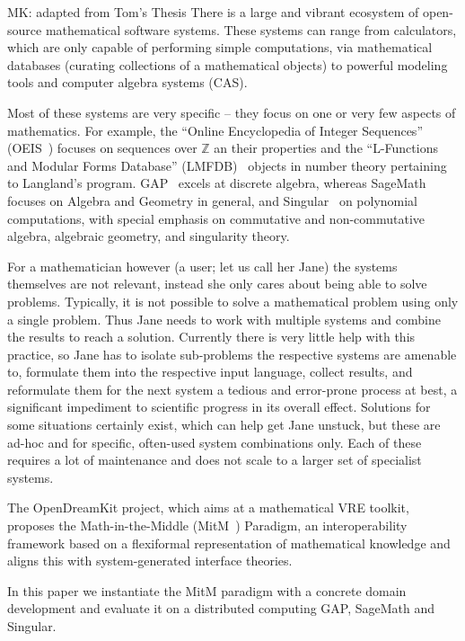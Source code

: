 \documentclass{llncs}
\begin{document}
\begin{newpart}{MK: adapted from Tom's Thesis}
There is a large and vibrant ecosystem of open-source mathematical software systems.
These systems can range from calculators, which are only capable of performing simple
computations, via mathematical databases (curating collections of a mathematical objects)
to powerful modeling tools and computer algebra systems (CAS). 

Most of these systems are very specific -- they focus on one or very few aspects of
mathematics.  For example, the ``Online Encyclopedia of Integer Sequences''
(OEIS~\cite{Sloane:oeis12,oeis}) focuses on sequences over $\mathbb{Z}$ an their
properties and the ``L-Functions and Modular Forms Database''
(LMFDB)~\cite{Cremona:LMFDB16,lmfdb:on} objects in number theory pertaining to Langland's
program.  GAP~\cite{GAP:on} excels at discrete algebra, whereas
SageMath~\cite{SageMath:on} focuses on Algebra and Geometry in general, and
Singular~\cite{singular:on} on polynomial computations, with special emphasis on
commutative and non-commutative algebra, algebraic geometry, and singularity theory.

For a mathematician however (a user; let us call her Jane) the systems themselves are not relevant, instead she only cares about being able to solve problems. 
Typically, it is not possible to solve a mathematical problem using only a single problem. 
Thus Jane needs to work with multiple systems and combine the results to reach a solution. 
Currently there is very little help with this practice, so Jane has to isolate sub-problems the respective systems are amenable to, formulate them into the respective input language, collect results, and reformulate them for the next system a tedious and error-prone process at best, a significant impediment to scientific progress in its overall effect. 
Solutions for some situations certainly exist, which can help get Jane unstuck, but these are ad-hoc and for specific, often-used system combinations only. 
Each of these requires a lot of maintenance and does not scale to a larger set of specialist systems. 

The OpenDreamKit project, which aims at a mathematical VRE toolkit, proposes the Math-in-the-Middle (MitM~\cite{DehKohKon:iop16}) Paradigm, an interoperability framework based on a flexiformal
representation of mathematical knowledge and aligns this with system-generated interface
theories. 

In this paper we instantiate the MitM paradigm with a concrete domain development and
evaluate it on a distributed computing GAP, SageMath and Singular.

\end{newpart}
\end{document}
